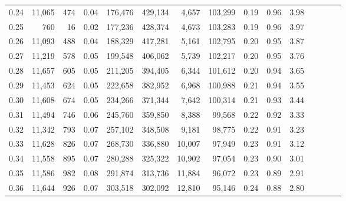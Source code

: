 \begin{tabular}{rrrcrrrrrrrrrrr}
0.24 &  11,065 &    474 &                                       0.04 &  176,476 &  429,134 &    4,657 &  103,299 &  0.19 &  0.96 &                         3.98 \\
0.25 &     760 &     16 &                                       0.02 &  177,236 &  428,374 &    4,673 &  103,283 &  0.19 &  0.96 &                         3.97 \\
0.26 &  11,093 &    488 &                                       0.04 &  188,329 &  417,281 &    5,161 &  102,795 &  0.20 &  0.95 &                         3.87 \\
0.27 &  11,219 &    578 &                                       0.05 &  199,548 &  406,062 &    5,739 &  102,217 &  0.20 &  0.95 &                         3.76 \\
0.28 &  11,657 &    605 &                                       0.05 &  211,205 &  394,405 &    6,344 &  101,612 &  0.20 &  0.94 &                         3.65 \\
0.29 &  11,453 &    624 &                                       0.05 &  222,658 &  382,952 &    6,968 &  100,988 &  0.21 &  0.94 &                         3.55 \\
0.30 &  11,608 &    674 &                                       0.05 &  234,266 &  371,344 &    7,642 &  100,314 &  0.21 &  0.93 &                         3.44 \\
0.31 &  11,494 &    746 &                                       0.06 &  245,760 &  359,850 &    8,388 &   99,568 &  0.22 &  0.92 &                         3.33 \\
0.32 &  11,342 &    793 &                                       0.07 &  257,102 &  348,508 &    9,181 &   98,775 &  0.22 &  0.91 &                         3.23 \\
0.33 &  11,628 &    826 &                                       0.07 &  268,730 &  336,880 &   10,007 &   97,949 &  0.23 &  0.91 &                         3.12 \\
0.34 &  11,558 &    895 &                                       0.07 &  280,288 &  325,322 &   10,902 &   97,054 &  0.23 &  0.90 &                         3.01 \\
0.35 &  11,586 &    982 &                                       0.08 &  291,874 &  313,736 &   11,884 &   96,072 &  0.23 &  0.89 &                         2.91 \\
0.36 &  11,644 &    926 &                                       0.07 &  303,518 &  302,092 &   12,810 &   95,146 &  0.24 &  0.88 &                         2.80 \\

\end{tabular}
